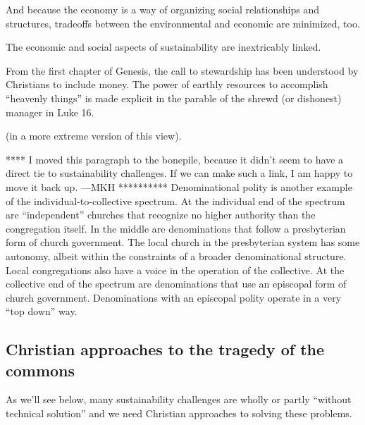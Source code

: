 \documentclass[12pt]{article}
\begin{document}
And because the economy is a way of organizing social relationships and structures,
tradeoffs between the environmental and economic are minimized, too.


The economic and social aspects of sustainability are inextricably linked. 

From the first chapter of Genesis, the call to stewardship has
been understood by Christians to include money. 
The power of earthly resources to accomplish ``heavenly things'' is made
explicit in the parable of the shrewd (or dishonest) manager in Luke 16. 

 (in a more extreme version of this view).



**** I moved this paragraph to the bonepile, because it didn't seem to have a direct tie
to sustainability challenges. 
If we can make such a link, I am happy to move it back up.
---MKH **********
 Denominational polity is another example of the individual-to-collective spectrum.
At the individual end of the spectrum are ``independent'' churches 
that recognize no higher authority than the congregation itself.
In the middle are denominations that follow a presbyterian form of church government. 
The local church in the presbyterian system has some autonomy, 
albeit within the constraints of a broader denominational structure. 
Local congregations also have a voice in the operation of the collective. 
At the collective end of the spectrum are denominations that use 
an episcopal form of church government. 
Denominations with an episcopal polity operate in a very ``top down'' way.


\subsection{Christian approaches to the tragedy of the commons}
\label{sec:totc}


As we'll see below, many sustainability challenges are wholly or partly ``without technical solution'' and we need
Christian approaches to solving these problems.






\printbibliography
\end{document}
